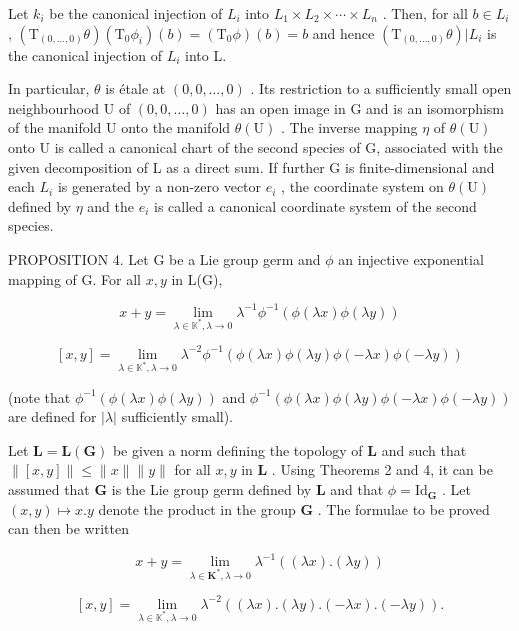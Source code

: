 Let \(k_{i}\) be the canonical injection of \(L_{i}\) into \(L_{1} \times L_{2} \times \cdots \times L_{n}\) . Then, for all \(b \in L_{i}\) , \((\mathrm{T}_{(0,\ldots,0)}\theta)(\mathrm{T}_{0}\phi_{i})(b) = (\mathrm{T}_{0}\phi)(b) = b\) and hence \((\mathrm{T}_{(0,\ldots,0)}\theta)|L_{i}\) is the canonical injection of \(L_{i}\) into L.

In particular, \(\theta\) is étale at \((0, 0, \ldots, 0)\) . Its restriction to a sufficiently small open neighbourhood U of \((0,0,\ldots,0)\) has an open image in G and is an isomorphism of the manifold U onto the manifold \(\theta(\mathrm{U})\) . The inverse mapping \(\eta\) of \(\theta(\mathrm{U})\) onto U is called a canonical chart of the second species of G, associated with the given decomposition of L as a direct sum. If further G is finite-dimensional and each \(L_{i}\) is generated by a non-zero vector \(e_{i}\) , the coordinate system on \(\theta(\mathrm{U})\) defined by \(\eta\) and the \(e_{i}\) is called a canonical coordinate system of the second species.

PROPOSITION 4. Let G be a Lie group germ and \(\phi\) an injective exponential mapping of G. For all \(x, y\) in L(G),


\[
x + y = \lim _ {\lambda \in \mathbb {K} ^ {*}, \lambda \rightarrow 0} \lambda^ {- 1} \phi^ {- 1} (\phi (\lambda x) \phi (\lambda y))\tag{1}
\]

\[
[ x, y ] = \lim _ {\lambda \in \mathbb {K} ^ {*}, \lambda \rightarrow 0} \lambda^ {- 2} \phi^ {- 1} (\phi (\lambda x) \phi (\lambda y) \phi (- \lambda x) \phi (- \lambda y))\tag{2}
\]

(note that \(\phi^{-1}(\phi(\lambda x)\phi(\lambda y))\) and \(\phi^{-1}(\phi(\lambda x)\phi(\lambda y)\phi(-\lambda x)\phi(-\lambda y))\) are defined for \(|\lambda|\) sufficiently small).

Let \(\mathbf{L} = \mathbf{L}(\mathbf{G})\) be given a norm defining the topology of \(\mathbf{L}\) and such that \(\| [x,y] \| \leqslant \| x \| \| y \|\) for all \(x, y\) in \(\mathbf{L}\) . Using Theorems 2 and 4, it can be assumed that \(\mathbf{G}\) is the Lie group germ defined by \(\mathbf{L}\) and that \(\phi = \mathrm{Id}_{\mathbf{G}}\) . Let \((x,y) \mapsto x.y\) denote the product in the group \(\mathbf{G}\) . The formulae to be proved can then be written


\[
x + y = \lim _ {\lambda \in \mathbf {K} ^ {*}, \lambda \rightarrow 0} \lambda^ {- 1} ((\lambda x). (\lambda y))\tag{3}
\]

\[
[ x, y ] = \lim _ {\lambda \in \mathbb {K} ^ {*}, \lambda \rightarrow 0} \lambda^ {- 2} ((\lambda x). (\lambda y). (- \lambda x). (- \lambda y)).\tag{4}
\]


